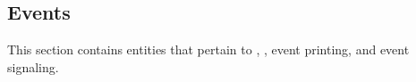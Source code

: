 \documentclass[10pt,twoside,english,pdftex]{article}
\begin{document}

\W\renewcommand{\subsubentities}{1}

\T\markright{}%
\T\pagestyle{plain}
\T\clearpage
\W{}
\T\pagestyle{fancy}
\T\thispagestyle{fancybottom}
\T\global\def\fnlastname{ }%

\subsection{Events}
\label{sec:events}%

This section contains  entities that pertain to
, , event printing, and event signaling.


\W\entities
\T\clearpage

\end{document}
